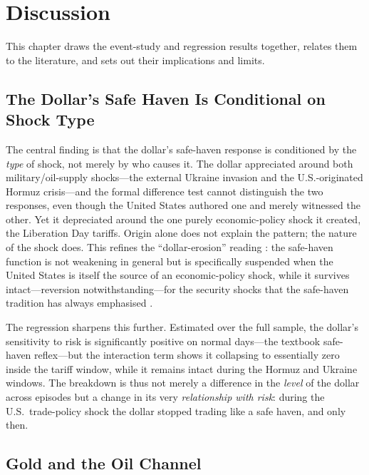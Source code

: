 
\chapter{Discussion}
\label{ch:discussion}

This chapter draws the event-study and regression results together, relates them to the
literature, and sets out their implications and limits.

\section{The Dollar's Safe Haven Is Conditional on Shock Type}
\label{sec:disc_hierarchy}

The central finding is that the dollar's safe-haven response is conditioned by the
\emph{type} of shock, not merely by who causes it. The dollar appreciated around both
military/oil-supply shocks---the external Ukraine invasion and the U.S.-originated Hormuz
crisis---and the formal difference test cannot distinguish the two responses, even though
the United States authored one and merely witnessed the other. Yet it depreciated around the
one purely economic-policy shock it created, the Liberation Day tariffs. Origin alone does
not explain the pattern; the nature of the shock does. This refines the ``dollar-erosion''
reading \parencite{corsetti2025,kamin2025}: the safe-haven function is not weakening in
general but is specifically suspended when the United States is itself the source of an
economic-policy shock, while it survives intact---reversion notwithstanding---for the
security shocks that the safe-haven tradition has always emphasised
\parencite{ranaldo2010,habib2012}.

The regression sharpens this further. Estimated over the full sample, the dollar's
sensitivity to risk is significantly positive on normal days---the textbook safe-haven
reflex---but the interaction term shows it collapsing to essentially zero inside the tariff
window, while it remains intact during the Hormuz and Ukraine windows. The breakdown is thus
not merely a difference in the \emph{level} of the dollar across episodes but a change in its
very \emph{relationship with risk}: during the U.S.\ trade-policy shock the dollar stopped
trading like a safe haven, and only then.

\section{Gold and the Oil Channel}
\label{sec:disc_oil}

